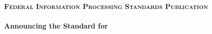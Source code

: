 
{

\begin{center}

\normalsize{\textbf{\textsc{Federal Information Processing Standards Publication }}}\\
\vspace{10pt}
\normalsize{\textbf{}}\\
\vspace{10pt}
\normalsize{\textbf{Announcing the Standard for}}\\
\Large{\textbf{}}
\end{center}

\vspace{10pt}

\titleformat{\section}[runin]{\normalsize\raggedright\bfseries\sffamily}{}{0em}{}	%
\titleformat{\subsection}[runin]{\normalsize\raggedright\bfseries\sffamily}{}{0em}{}	%
\titleformat{\subsubsection}[runin]{\normalsize\raggedright\bfseries\sffamily}{}{0em}{}	%
\titleformat{\paragraph}[runin]{\normalsize\raggedright\bfseries\sffamily}{}{0em}{}	%



}